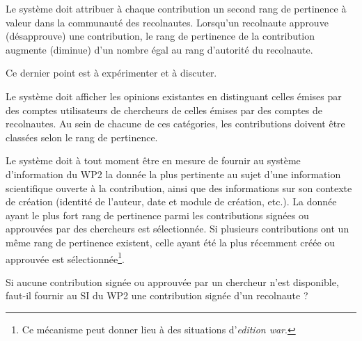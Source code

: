 \exig{}
Le système doit attribuer à chaque contribution un second rang de pertinence à valeur dans la communauté des recolnautes.
Lorsqu'un recolnaute approuve (désapprouve) une contribution, le rang de pertinence de la contribution augmente (diminue) d'un nombre égal au rang d'autorité du recolnaute.

\idea{} Ce dernier point est à expérimenter et à discuter.

\exig{}
Le système doit afficher les opinions existantes en distinguant celles émises par des comptes utilisateurs de chercheurs de celles émises par des comptes de recolnautes.
Au sein de chacune de ces catégories, les contributions doivent être classées selon le rang de pertinence.

\startsubsubsection[title={En dehors de R+}]

\exig{}
Le système doit à tout moment être en mesure de fournir au système d'information du WP2 la donnée la plus pertinente au sujet d'une information scientifique ouverte à la contribution, ainsi que des informations sur son contexte de création (identité de l'auteur, date et module de création, etc.).
La donnée ayant le plus fort rang de pertinence parmi les contributions signées ou approuvées par des chercheurs est sélectionnée.
Si plusieurs contributions ont un même rang de pertinence existent, celle ayant été la plus récemment créée ou approuvée est sélectionnée\footnote{Ce mécanisme peut donner lieu à des situations d'{\it edition war}.}.

\idea{}
Si aucune contribution signée ou approuvée par un chercheur n'est disponible, faut-il fournir au SI du WP2 une contribution signée d'un recolnaute ?

\startsection[title={Éléments de modélisation},reference=c:relopn:s:model]

\startsubsection[title={Contribution = Relation + Opinion}]

